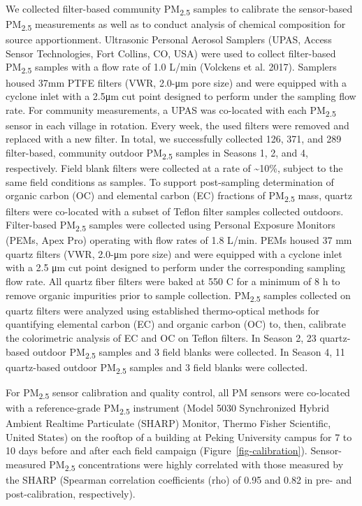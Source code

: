 \documentclass[
  letterpaper,
  DIV=11,
  numbers=noendperiod]{scrartcl}
\begin{document}
We collected filter-based community PM\textsubscript{2.5} samples to
calibrate the sensor-based PM\textsubscript{2.5} measurements as well as
to conduct analysis of chemical composition for source apportionment.
Ultrasonic Personal Aerosol Samplers (UPAS, Access Sensor Technologies,
Fort Collins, CO, USA) were used to collect filter-based
PM\textsubscript{2.5} samples with a flow rate of 1.0 L/min (Volckens et
al. 2017). Samplers housed 37mm PTFE filters (VWR, 2.0-μm pore size) and
were equipped with a cyclone inlet with a 2.5μm cut point designed to
perform under the sampling flow rate. For community measurements, a UPAS
was co-located with each PM\textsubscript{2.5} sensor in each village in
rotation. Every week, the used filters were removed and replaced with a
new filter. In total, we successfully collected 126, 371, and 289
filter-based, community outdoor PM\textsubscript{2.5} samples in Seasons
1, 2, and 4, respectively. Field blank filters were collected at a rate
of \textasciitilde10\%, subject to the same field conditions as samples.
To support post-sampling determination of organic carbon (OC) and
elemental carbon (EC) fractions of PM\textsubscript{2.5} mass, quartz
filters were co-located with a subset of Teflon filter samples collected
outdoors. Filter-based PM\textsubscript{2.5} samples were collected
using Personal Exposure Monitors (PEMs, Apex Pro) operating with flow
rates of 1.8 L/min. PEMs housed 37 mm quartz filters (VWR, 2.0-μm pore
size) and were equipped with a cyclone inlet with a 2.5 μm cut point
designed to perform under the corresponding sampling flow rate. All
quartz fiber filters were baked at 550 C for a minimum of 8 h to remove
organic impurities prior to sample collection. PM\textsubscript{2.5}
samples collected on quartz filters were analyzed using established
thermo-optical methods for quantifying elemental carbon (EC) and organic
carbon (OC) to, then, calibrate the colorimetric analysis of EC and OC
on Teflon filters. In Season 2, 23 quartz-based outdoor
PM\textsubscript{2.5} samples and 3 field blanks were collected. In
Season 4, 11 quartz-based outdoor PM\textsubscript{2.5} samples and 3
field blanks were collected.

For PM\textsubscript{2.5} sensor calibration and quality control, all PM
sensors were co-located with a reference-grade PM\textsubscript{2.5}
instrument (Model 5030 Synchronized Hybrid Ambient Realtime Particulate
(SHARP) Monitor, Thermo Fisher Scientific, United States) on the rooftop
of a building at Peking University campus for 7 to 10 days before and
after each field campaign (Figure~\ref{fig-calibration}).
Sensor-measured PM\textsubscript{2.5} concentrations were highly
correlated with those measured by the SHARP (Spearman correlation
coefficients (rho) of 0.95 and 0.82 in pre- and post-calibration,
respectively).
\end{document}
